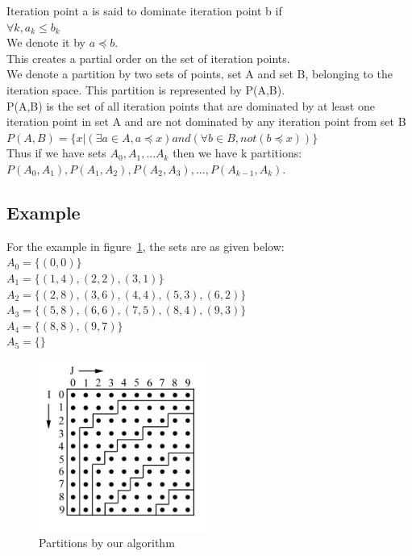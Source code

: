 Iteration point a is said to dominate iteration point b if\\
 $ \forall k,  a_k \leq b_k$ \\
We denote it by $a \preceq b$.\\
This creates a partial order on the set of iteration points.\\

We denote a partition by two sets of points, set A and set B, belonging to the iteration space. This partition is represented by P(A,B). \\

P(A,B) is the set of all iteration points that are dominated by at least one iteration point in set A and are not dominated by any iteration point from set B \\
$P(A,B) = \{x | ( \exists a \in A, a \preceq x) and (\forall b \in B, not(b \preceq x))\}$ \\

Thus if we have sets $A_0, A_1, ... A_k$ then we have k partitions: \\
$P(A_0,A_1), P(A_1, A_2), P(A_2, A_3), ... , P(A_{k-1}, A_k)$. \\

\subsection{Example}

For the example in figure~\ref{fig:partition_eg}, the sets are as given below: \\
$A_0 = \{(0,0)\}$ \\
$A_1 = \{(1,4), (2,2), (3,1)\}$ \\
$A_2 = \{(2,8), (3,6), (4,4), (5,3), (6,2)\}$ \\
$A_3 = \{(5,8), (6,6), (7,5), (8,4), (9,3)\}$ \\
$A_4 = \{(8,8), (9,7)\}$ \\
$A_5 = \{\}$ \\

\begin{figure}
\caption{Partitions by our algorithm}
\label{fig:partition_eg}
\centering \includegraphics[width=0.5\textwidth]{Figures/fig2.jpg}
\end{figure}

